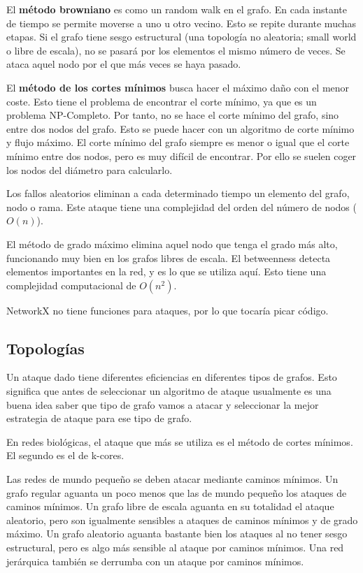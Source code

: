 El \textbf{método browniano} es como un random walk en el grafo. En cada instante de tiempo se permite moverse a uno u otro vecino. Esto se repite durante muchas etapas. Si el grafo tiene sesgo estructural (una topología no aleatoria; small world o libre de escala), no se pasará por los elementos el mismo número de veces. Se ataca aquel nodo por el que más veces se haya pasado. 

El \textbf{método de los cortes mínimos} busca hacer el máximo daño con el menor coste. Esto tiene el problema de encontrar el corte mínimo, ya que es un problema NP-Completo. Por tanto, no se hace el corte mínimo del grafo, sino entre dos nodos del grafo. Esto se puede hacer con un algoritmo de corte mínimo y flujo máximo. El corte mínimo del grafo siempre es menor o igual que el corte mínimo entre dos nodos, pero es muy difícil de encontrar. Por ello se suelen coger los nodos del diámetro para calcularlo.

Los fallos aleatorios eliminan a cada determinado tiempo un elemento del grafo, nodo o rama. Este ataque tiene una complejidad del orden del número de nodos ($O(n)$). 

El método de grado máximo elimina aquel nodo que tenga el grado más alto, funcionando muy bien en los grafos libres de escala. El betweenness detecta elementos importantes en la red, y es lo que se utiliza aquí. Esto tiene una complejidad computacional de $O(n^2)$.

NetworkX no tiene funciones para ataques, por lo que tocaría picar código.

\subsection{Topologías}
Un ataque dado tiene diferentes eficiencias en diferentes tipos de grafos. Esto significa que antes de seleccionar un algoritmo de ataque usualmente es una buena idea saber que tipo de grafo vamos a atacar y seleccionar la mejor estrategia de ataque para ese tipo de grafo.

En redes biológicas, el ataque que más se utiliza es el método de cortes mínimos. El segundo es el de k-cores.

Las redes de mundo pequeño se deben atacar mediante caminos mínimos. Un grafo regular aguanta un poco menos que las de mundo pequeño los ataques de caminos mínimos. Un grafo libre de escala aguanta en su totalidad el ataque aleatorio, pero son igualmente sensibles a ataques de caminos mínimos y de grado máximo. Un grafo aleatorio aguanta bastante bien los ataques al no tener sesgo estructural, pero es algo más sensible al ataque por caminos mínimos. Una red jerárquica también se derrumba con un ataque por caminos mínimos.

